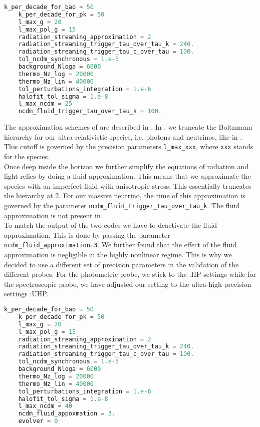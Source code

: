 \documentclass[../main.tex]{subfiles}
\begin{document}
\begin{lstlisting}[language=Python,caption=\class:HP precision settings, label=lst:classHP]
    k_per_decade_for_bao = 50
    k_per_decade_for_pk = 50
    l_max_g = 20
    l_max_pol_g = 15
    radiation_streaming_approximation = 2
    radiation_streaming_trigger_tau_over_tau_k = 240.
    radiation_streaming_trigger_tau_c_over_tau = 100.
    tol_ncdm_synchronous = 1.e-5
    background_Nloga = 6000
    thermo_Nz_log = 20000
    thermo_Nz_lin = 40000
    tol_perturbations_integration = 1.e-6
    halofit_tol_sigma = 1.e-8
    l_max_ncdm = 25
    ncdm_fluid_trigger_tau_over_tau_k = 100.
\end{lstlisting} 
 The approximation schemes of \class are described in \cite{Blas:2011rf}. In \class, we truncate the Boltzmann hierarchy for our ultra-relativistic species, i.e. photons and neutrinos, like in \camb. This cutoff is governed by the precision parameters {\tt l\_max\_xxx}, where {\tt xxx} stands for the species.\\
 Once deep inside the horizon we further simplify the equations of radiation and light relics by doing a fluid approximation. This means that we approximate the species with an imperfect fluid with anisotropic stress. This essentially truncates the hierarchy at 2. For our massive neutrino, the time of this approximation is governed by the parameter {\tt ncdm\_fluid\_trigger\_tau\_over\_tau\_k}.
 The fluid approximation is not present in \camb.\\
  To match the output of the two codes we have to deactivate the fluid approximation. This is done by passing the parameter {\tt ncdm\_fluid\_approximation=3}. We further found that the effect of the fluid approximation is negligible in the highly nonlinear regime. This is why we decided to use a different set of precision parameters in the validation of the different probes. For the photometric probe, we stick to the \class:HP settings while for the spectroscopic probe, we have adjusted our setting to the ultra-high precision settings \class:UHP.
 \begin{lstlisting}[language=Python,caption=\class:UHP precision settings, label=lst:classUHP]
    k_per_decade_for_bao = 50
    k_per_decade_for_pk = 50
    l_max_g = 20
    l_max_pol_g = 15
    radiation_streaming_approximation = 2
    radiation_streaming_trigger_tau_over_tau_k = 240.
    radiation_streaming_trigger_tau_c_over_tau = 100.
    tol_ncdm_synchronous = 1.e-5
    background_Nloga = 6000
    thermo_Nz_log = 20000
    thermo_Nz_lin = 40000
    tol_perturbations_integration = 1.e-6
    halofit_tol_sigma = 1.e-8
    l_max_ncdm = 40
    ncdm_fluid_appoxmation = 3.
    evolver = 0
 \end{lstlisting}
\end{document}
